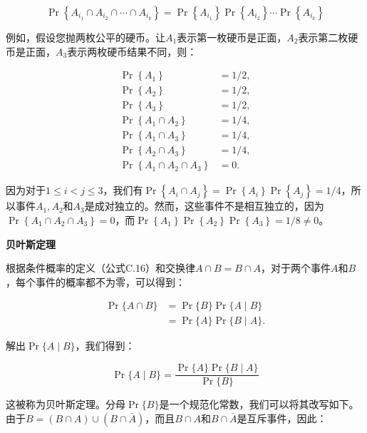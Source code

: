 \documentclass[lang=cn,newtx,10pt,scheme=chinese]{elegantbook}
\begin{document}
$$
\operatorname{Pr}\left\{A_{i_1} \cap A_{i_2} \cap \cdots \cap A_{i_k}\right\}=\operatorname{Pr}\left\{A_{i_1}\right\} \operatorname{Pr}\left\{A_{i_2}\right\} \cdots \operatorname{Pr}\left\{A_{i_k}\right\}
$$

例如，假设您抛两枚公平的硬币。让$A_1$表示第一枚硬币是正面，$A_2$表示第二枚硬币是正面，$A_3$表示两枚硬币结果不同，则：

$$
\begin{aligned}
\operatorname{Pr}\left\{A_1\right\} & =1 / 2, \\
\operatorname{Pr}\left\{A_2\right\} & =1 / 2, \\
\operatorname{Pr}\left\{A_3\right\} & =1 / 2, \\
\operatorname{Pr}\left\{A_1 \cap A_2\right\} & =1 / 4, \\
\operatorname{Pr}\left\{A_1 \cap A_3\right\} & =1 / 4, \\
\operatorname{Pr}\left\{A_2 \cap A_3\right\} & =1 / 4, \\
\operatorname{Pr}\left\{A_1 \cap A_2 \cap A_3\right\} & =0 .
\end{aligned}
$$

因为对于$1 \leq i<j \leq 3$，我们有$\operatorname{Pr}\left\{A_i \cap A_j\right\}=\operatorname{Pr}\left\{A_i\right\} \operatorname{Pr}\left\{A_j\right\}=1 / 4$，所以事件$A_1, A_2$和$A_3$是成对独立的。然而，这些事件不是相互独立的，因为$\operatorname{Pr}\left\{A_1 \cap A_2 \cap A_3\right\}=0$，而$\operatorname{Pr}\left\{A_1\right\} \operatorname{Pr}\left\{A_2\right\} \operatorname{Pr}\left\{A_3\right\}=1 / 8 \neq 0$。

\textbf{贝叶斯定理}

根据条件概率的定义（公式C.16）和交换律$A \cap B=B \cap A$，对于两个事件$A$和$B$，每个事件的概率都不为零，可以得到：

$$
\begin{aligned}
\operatorname{Pr}\{A \cap B\} & =\operatorname{Pr}\{B\} \operatorname{Pr}\{A \mid B\} \\
& =\operatorname{Pr}\{A\} \operatorname{Pr}\{B \mid A\} .
\end{aligned}
$$

解出$\operatorname{Pr}\{A \mid B\}$，我们得到：

$$
\operatorname{Pr}\{A \mid B\}=\frac{\operatorname{Pr}\{A\} \operatorname{Pr}\{B \mid A\}}{\operatorname{Pr}\{B\}}
$$

这被称为贝叶斯定理。分母$\operatorname{Pr}\{B\}$是一个规范化常数，我们可以将其改写如下。由于$B=(B \cap A) \cup(B \cap \bar{A})$，而且$B \cap A$和$B \cap \bar{A}$是互斥事件，因此：
\end{document}
